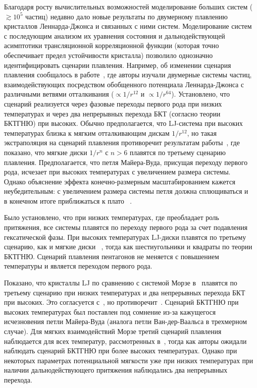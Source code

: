 Благодаря росту вычислительных возможностей моделирование больших систем ($\gtrsim 10^5$ частиц) недавно дало новые результаты по двумерному плавлению кристаллов Леннарда-Джонса и связанных с ними систем. Моделирование систем с последующим анализом их уравнения состояния и дальнодействующей асимптотики трансляционной корреляционной функции (которая точно обеспечивает предел устойчивости кристалла) позволило однозначно идентифицировать сценарии плавления. Например, об изменении сценария плавления сообщалось в работе~\cite{10.1103/physreve.99.022145}, где авторы изучали двумерные системы частиц, взаимодействующих посредством обобщенного потенциала Леннарда-Джонса с различными ветвями отталкивания ($\propto 1/r ^{12}$ и $\propto 1/r^{64}$). Установлено, что сценарий реализуется через фазовые переходы первого рода при низких температурах и через два непрерывных перехода БКТ (согласно теории БКТГНЮ) при высоких. Обычно предполагается, что LJ-система при высоких температурах близка к мягким отталкивающим дискам $1/r^{12}$, но такая экстраполяция на сценарий плавления противоречит результатам работы~\cite{10.1103/physrevlett.114.035702}, где показано, что мягкие диски $1/r^n$ с $n>6$ плавятся по третьему сценарию плавления. Предполагается, что петля Майера-Вуда, присущая переходу первого рода, исчезает при высоких температурах с увеличением размера системы. Однако объяснение эффекта конечно-размерным масштабированием кажется неубедительным: с увеличением размера системы петля должна сплющиваться и в конечном итоге приближаться к плато ~\cite{10.1103/physreve.87.042134, 10.1103/physreve.59.2659}.

Было установлено, что при низких температурах, где преобладает роль притяжения, все системы плавятся по переходу первого рода за счет подавления гексатической фазы. При высоких температурах LJ-диски плавятся по третьему сценарию, как и мягкие диски ~\cite{10.1103/physrevlett.114.035702}, тогда как шестиугольники и квадраты по теории БКТГНЮ. Сценарий плавления пентагонов не меняется с повышением температуры и является переходом первого рода.

Показано, что кристаллы LJ по сравнению с системой Морзе в~\cite{10.1103/physrevb.103.094107} плавятся по третьему сценарию при низких температурах и два непрерывных перехода БКТ при высоких. Это согласуется с~\cite{10.1103/physreve.99.022145}, но противоречит~\cite{10.1103/physrevlett.114.035702}. Сценарий БКТГНЮ при высоких температурах был поставлен под сомнение из-за кажущегося исчезновения петли Майера-Вуда (аналога петли Ван-дер-Ваальса в трехмерном случае). Для мягких взаимодействий Морзе третий сценарий плавления наблюдается для всех температур, рассмотренных в~\cite{10.1103/physrevb.103.094107}, тогда как авторы ожидали наблюдать сценарий БКТГНЮ при более высоких температурах. Однако при некоторых параметрах потенциальной мягкости уже при низких температурах при наличии дальнодействующего притяжения наблюдались два непрерывных перехода.

